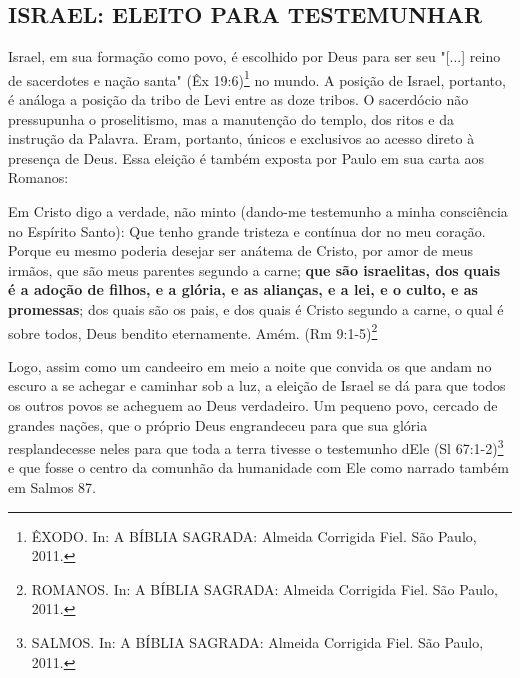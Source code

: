 \documentclass[
    article,            %
	12pt,				%
	oneside,			%
	a4paper,			%
	chapter=TITLE,		%
	section=TITLE,		%
	english,			%
	french,				%
	spanish,			%
	brazil				%
	]{abntex2}
\begin{document}
\subsection{ISRAEL: ELEITO PARA TESTEMUNHAR}
Israel, em sua formação como povo, é escolhido por Deus para ser seu "[...] reino de sacerdotes e nação santa" (Êx 19:6)\footnote{ÊXODO. In: A BÍBLIA SAGRADA: Almeida Corrigida Fiel. São Paulo, 2011.} no mundo. A posição de Israel, portanto, é análoga a posição da tribo de Levi entre as doze tribos. O sacerdócio não pressupunha o proselitismo, mas a manutenção do templo, dos ritos e da instrução da Palavra. Eram, portanto, únicos e exclusivos ao acesso direto à presença de Deus. Essa eleição é também exposta por Paulo em sua carta aos Romanos:
\begin{citacao}
Em Cristo digo a verdade, não minto (dando-me testemunho a minha consciência no Espírito Santo): Que tenho grande tristeza e contínua dor no meu coração. Porque eu mesmo poderia desejar ser anátema de Cristo, por amor de meus irmãos, que são meus parentes segundo a carne; \textbf{que são israelitas, dos quais é a adoção de filhos, e a glória, e as alianças, e a lei, e o culto, e as promessas}; dos quais são os pais, e dos quais é Cristo segundo a carne, o qual é sobre todos, Deus bendito eternamente. Amém. (Rm 9:1-5)\footnote{ROMANOS. In: A BÍBLIA SAGRADA: Almeida Corrigida Fiel. São Paulo, 2011.}
\end{citacao}
Logo, assim como um candeeiro em meio a noite que convida os que andam no escuro a se achegar e caminhar sob a luz, a eleição de Israel se dá para que todos os outros povos se acheguem ao Deus verdadeiro. Um pequeno povo, cercado de grandes nações, que o próprio Deus engrandeceu para que sua glória resplandecesse neles para que toda a terra tivesse o testemunho dEle (Sl 67:1-2)\footnote{SALMOS. In: A BÍBLIA SAGRADA: Almeida Corrigida Fiel. São Paulo, 2011.} e que fosse o centro da comunhão da humanidade com Ele como narrado também em Salmos 87.
\end{document}
